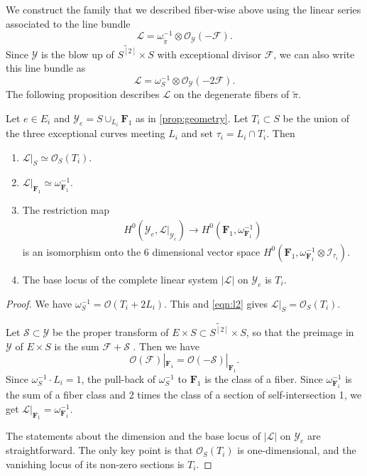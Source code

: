 \documentclass[reqno]{amsart}
\renewcommand{\to}{{\longrightarrow}}
\numberwithin{equation}{section}
\renewcommand{\O}{\mathcal{O}}
\newcommand{\F}{\mathbf{F}}
\begin{document}
We construct the family that we described fiber-wise above using the linear series associated to the line bundle
\begin{equation}\label{eqn:l1}
  \mathcal{L} = \omega_{\widetilde{\pi}}^{-1} \otimes \O_{\mathcal{Y}}(-\mathcal{F}).
\end{equation}
Since $\mathcal{Y}$ is the blow up of $\widetilde{S^{[2]}} \times S$ with exceptional divisor $\mathcal{F}$, we can also write this line bundle as
\begin{equation}\label{eqn:l2}
  \mathcal{L} = \omega_{S}^{-1} \otimes \O_{\mathcal{Y}}(-2\mathcal{F}).
\end{equation}
The following proposition describes $\mathcal{L}$ on the degenerate fibers of $\widetilde{\pi}$.
\begin{proposition}
  \label{prop:LYe}
  Let $e \in E_{i}$ and $\mathcal{Y}_{e} = S \cup_{L_{i}} \F_{1}$ as in \autoref{prop:geometry}.
  Let $T_i \subset S$ be the union of the three exceptional curves meeting $L_i$ and set $\tau_i = L_i \cap T_i$.
  Then
  \begin{enumerate}
  \item $\mathcal{L}|_{S} \simeq \O_{S}(T_{i})$.
  \item $\mathcal{L}|_{\F_{1}} \simeq \omega_{\F_1}^{-1}$.
  \item The restriction map
  \begin{align}
    \label{eq:restrL}
    H^{0}(\mathcal{Y}_{e}, \mathcal{L}|_{\mathcal{Y}_{e}}) \to H^{0}(\F_{1}, \omega_{\F_1}^{-1})
  \end{align}
  is an isomorphism onto the $6$ dimensional vector space
  $H^{0}\left(\F_{1}, \omega_{\F_1}^{-1}\otimes \mathcal{I}_{\tau_{i}}\right).$
\item The base locus of the complete linear system $|\mathcal{L}|$ on $\mathcal{Y}_e$ is $T_i$.
  \end{enumerate}
\end{proposition}
\begin{proof}
  We have $\omega_S^{-1} = \O(T_i + 2L_i)$.
  This and \eqref{eqn:l2} gives $\mathcal{L}|_S = \O_S(T_i)$.

  Let $\mathcal{S} \subset \mathcal{Y}$ be the proper transform of $E \times S \subset \widetilde{S^{[2]}} \times S$, so that the preimage in $\mathcal{Y}$ of $E \times S$ is the sum $\mathcal{F} + \mathcal{S}$  .
  Then we have
  \[\O(\mathcal{F})|_{\F_1} = \O(-\mathcal{S})|_{\F_1}.\]
  Since $\omega_S^{-1} \cdot L_i = 1$, the pull-back of $\omega_S^{-1}$ to $\F_1$ is the class of a fiber.
  Since $\omega^{-1}_{\F_1}$ is the sum of a fiber class and 2 times the class of a section of self-intersection 1, we get $\mathcal{L}|_{\F_1} = \omega_{\F_1}^{-1}$.

  The statements about the dimension and the base locus of $|\mathcal{L}|$ on $\mathcal{Y}_e$ are straightforward.
  The only key point is that $\O_S(T_i)$ is one-dimensional, and the vanishing locus of its non-zero sections is $T_i$.
\end{proof}
\end{document}
